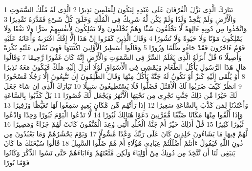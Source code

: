 \documentclass[20pt,a4paper]{article}
\title{}
\author{}
\date{}
\begin{document}
\pagecolor{cl_page}



{\tiny\colorbox{cl_aya}{1}} تَبَارَكَ الَّذِى نَزَّلَ الْفُرْقَانَ عَلَى عَبْدِهِ لِيَكُونَ لِلْعَلَمِينَ نَذِيرًا
{\tiny\colorbox{cl_aya}{2}} الَّذِى لَهُ مُلْكُ السَّمَوَتِ وَالْأَرْضِ وَلَمْ يَتَّخِذْ وَلَدًا وَلَمْ يَكُن لَّهُ شَرِيكٌ فِى الْمُلْكِ وَخَلَقَ كُلَّ شَىْءٍ فَقَدَّرَهُ تَقْدِيرًا
{\tiny\colorbox{cl_aya}{3}} وَاتَّخَذُوا مِن دُونِهِ ءَالِهَةً لَّا يَخْلُقُونَ شَئًْا وَهُمْ يُخْلَقُونَ وَلَا يَمْلِكُونَ لِأَنفُسِهِمْ ضَرًّا وَلَا نَفْعًا وَلَا يَمْلِكُونَ مَوْتًا وَلَا حَيَوةً وَلَا نُشُورًا
{\tiny\colorbox{cl_aya}{4}} وَقَالَ الَّذِينَ كَفَرُوا إِنْ هَذَا إِلَّا إِفْكٌ افْتَرَىهُ وَأَعَانَهُ عَلَيْهِ قَوْمٌ ءَاخَرُونَ فَقَدْ جَاءُو ظُلْمًا وَزُورًا
{\tiny\colorbox{cl_aya}{5}} وَقَالُوا أَسَطِيرُ الْأَوَّلِينَ اكْتَتَبَهَا فَهِىَ تُمْلَى عَلَيْهِ بُكْرَةً وَأَصِيلًا
{\tiny\colorbox{cl_aya}{6}} قُلْ أَنزَلَهُ الَّذِى يَعْلَمُ السِّرَّ فِى السَّمَوَتِ وَالْأَرْضِ إِنَّهُ كَانَ غَفُورًا رَّحِيمًا
{\tiny\colorbox{cl_aya}{7}} وَقَالُوا مَالِ هَذَا الرَّسُولِ يَأْكُلُ الطَّعَامَ وَيَمْشِى فِى الْأَسْوَاقِ لَوْلَا أُنزِلَ إِلَيْهِ مَلَكٌ فَيَكُونَ مَعَهُ نَذِيرًا
{\tiny\colorbox{cl_aya}{8}} أَوْ يُلْقَى إِلَيْهِ كَنزٌ أَوْ تَكُونُ لَهُ جَنَّةٌ يَأْكُلُ مِنْهَا وَقَالَ الظَّلِمُونَ إِن تَتَّبِعُونَ إِلَّا رَجُلًا مَّسْحُورًا
{\tiny\colorbox{cl_aya}{9}} انظُرْ كَيْفَ ضَرَبُوا لَكَ الْأَمْثَلَ فَضَلُّوا فَلَا يَسْتَطِيعُونَ سَبِيلًا
{\tiny\colorbox{cl_aya}{10}} تَبَارَكَ الَّذِى إِن شَاءَ جَعَلَ لَكَ خَيْرًا مِّن ذَلِكَ جَنَّتٍ تَجْرِى مِن تَحْتِهَا الْأَنْهَرُ وَيَجْعَل لَّكَ قُصُورًا
{\tiny\colorbox{cl_aya}{11}} بَلْ كَذَّبُوا بِالسَّاعَةِ وَأَعْتَدْنَا لِمَن كَذَّبَ بِالسَّاعَةِ سَعِيرًا
{\tiny\colorbox{cl_aya}{12}} إِذَا رَأَتْهُم مِّن مَّكَانٍ بَعِيدٍ سَمِعُوا لَهَا تَغَيُّظًا وَزَفِيرًا
{\tiny\colorbox{cl_aya}{13}} وَإِذَا أُلْقُوا مِنْهَا مَكَانًا ضَيِّقًا مُّقَرَّنِينَ دَعَوْا هُنَالِكَ ثُبُورًا
{\tiny\colorbox{cl_aya}{14}} لَّا تَدْعُوا الْيَوْمَ ثُبُورًا وَحِدًا وَادْعُوا ثُبُورًا كَثِيرًا
{\tiny\colorbox{cl_aya}{15}} قُلْ أَذَلِكَ خَيْرٌ أَمْ جَنَّةُ الْخُلْدِ الَّتِى وُعِدَ الْمُتَّقُونَ كَانَتْ لَهُمْ جَزَاءً وَمَصِيرًا
{\tiny\colorbox{cl_aya}{16}} لَّهُمْ فِيهَا مَا يَشَاءُونَ خَلِدِينَ كَانَ عَلَى رَبِّكَ وَعْدًا مَّسُْٔولًا
{\tiny\colorbox{cl_aya}{17}} وَيَوْمَ يَحْشُرُهُمْ وَمَا يَعْبُدُونَ مِن دُونِ اللَّهِ فَيَقُولُ ءَأَنتُمْ أَضْلَلْتُمْ عِبَادِى هَؤُلَاءِ أَمْ هُمْ ضَلُّوا السَّبِيلَ
{\tiny\colorbox{cl_aya}{18}} قَالُوا سُبْحَنَكَ مَا كَانَ يَنبَغِى لَنَا أَن نَّتَّخِذَ مِن دُونِكَ مِنْ أَوْلِيَاءَ وَلَكِن مَّتَّعْتَهُمْ وَءَابَاءَهُمْ حَتَّى نَسُوا الذِّكْرَ وَكَانُوا قَوْمًا بُورًا
\end{document}

